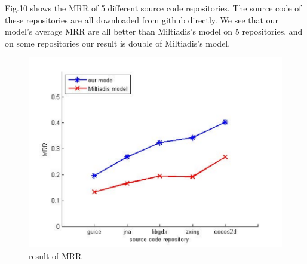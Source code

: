 Fig.10 shows the MRR of 5 different source code repositories. The source code of these repositories are all downloaded from github directly. We see that our model's average MRR are all better than Miltiadis's model on 5 repositories, and on some repositories our result is double of Miltiadis's model.
\begin{figure}[!htp]
 \centering
 \includegraphics[width=\linewidth]{img/MRR.pdf}
 \caption{result of MRR}
\end{figure}

